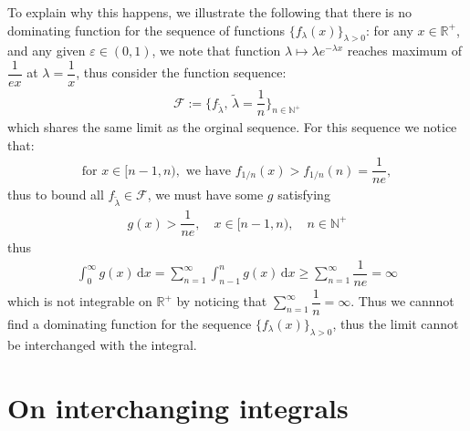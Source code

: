 \documentclass[11pt,a4paper]{article}
\numberwithin{equation}{section}%
\begin{document}
To explain why this happens, we illustrate the following that there is no dominating function for the sequence of functions $ \{f_\lambda (x)\}_{\lambda>0} $: for any $ x\in\mathbb{R}^+ $, and any given $ \varepsilon \in (0,1) $, we note that function $ \lambda \mapsto \lambda e^{-\lambda x} $ reaches maximum of $ \dfrac{ 1 }{ ex }  $ at $ \lambda =\dfrac{ 1 }{ x }  $, thus consider the function sequence:
\begin{align*}
    \mathcal{F}:=\{f_{\tilde{\lambda }}, \, \tilde{\lambda } = \dfrac{ 1 }{ n } \}_{n\in\mathbb{N}^+} 
\end{align*}
which shares the same limit as the orginal sequence. For this sequence we notice that:
\begin{align*}
    \text{for }x\in[n-1,n),\text{ we have }f_{1/n}(x)>f_{1/n}(n)=\dfrac{ 1 }{ ne },
\end{align*}
thus to bound all $ f_{\tilde{\lambda }}\in\mathcal{F} $, we must have some $ g $ satisfying 
\begin{align*}
    g(x) > \dfrac{ 1 }{ ne },\quad x\in [n-1,n),\quad n\in\mathbb{N}^+
\end{align*}
thus
\begin{align*}
    \int_0^\infty g(x)\,\mathrm{d}x = \sum_{n=1}^\infty \int_{n-1}^n g(x)\,\mathrm{d}x \geq \sum_{n=1}^\infty \dfrac{ 1 }{ ne } =\infty
\end{align*}
which is not integrable on $ \mathbb{R}^+ $ by noticing that $ \sum_{n=1}^\infty \dfrac{ 1 }{ n} =\infty $. Thus we cannnot find a dominating function for the sequence $ \{f_\lambda (x)\}_{\lambda>0} $, thus the limit cannot be interchanged with the integral.



 




\section{On interchanging integrals}
\end{document}
